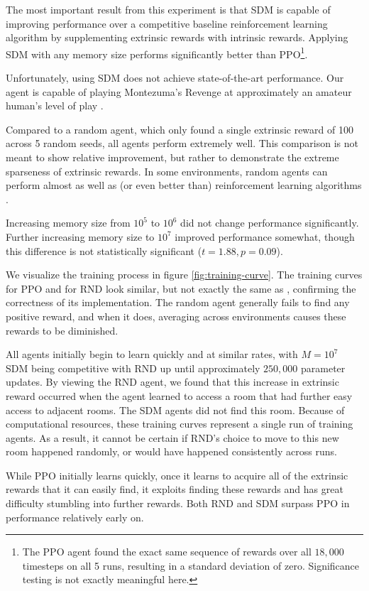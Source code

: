 \documentclass[journal, onecolumn, 12pt, draftclsnofoot]{IEEEtran}
\begin{document}
	\par The most important result from this experiment is that SDM is capable of improving performance over a competitive baseline reinforcement learning algorithm by supplementing extrinsic rewards with intrinsic rewards. Applying SDM with any memory size performs significantly better than PPO\footnote{The PPO agent found the exact same sequence of rewards over all $18,000$ timesteps on all 5 runs, resulting in a standard deviation of zero. Significance testing is not exactly meaningful here.}.
	\par Unfortunately, using SDM does not achieve state-of-the-art performance. Our agent is capable of playing Montezuma's Revenge at approximately an amateur human's level of play \cite{rnd}.
	\par Compared to a random agent, which only found a single extrinsic reward of 100 across 5 random seeds, all agents perform extremely well. This comparison is not meant to show relative improvement, but rather to demonstrate the extreme sparseness of extrinsic rewards. In some environments, random agents can perform almost as well as (or even better than) reinforcement learning algorithms \cite{rnd}.
	\par Increasing memory size from $10^5$ to $10^6$ did not change performance significantly. Further increasing memory size to $10^7$ improved performance somewhat, though this difference is not statistically significant ($t=1.88, p=0.09$).
	\par We visualize the training process in figure \ref{fig:training-curve}. The training curves for PPO and for RND look similar, but not exactly the same as \cite{rnd}, confirming the correctness of its implementation. The random agent generally fails to find any positive reward, and when it does, averaging across environments causes these rewards to be diminished.
	\par All agents initially begin to learn quickly and at similar rates, with $M=10^7$ SDM being competitive with RND up until approximately $250,000$ parameter updates. By viewing the RND agent, we found that this increase in extrinsic reward occurred when the agent learned to access a room that had further easy access to adjacent rooms. The SDM agents did not find this room. Because of computational resources, these training curves represent a single run of training agents. As a result, it cannot be certain if RND's choice to move to this new room happened randomly, or would have happened consistently across runs.
	\par While PPO initially learns quickly, once it learns to acquire all of the extrinsic rewards that it can easily find, it exploits finding these rewards and has great difficulty stumbling into further rewards. Both RND and SDM surpass PPO in performance relatively early on.
\end{document}
